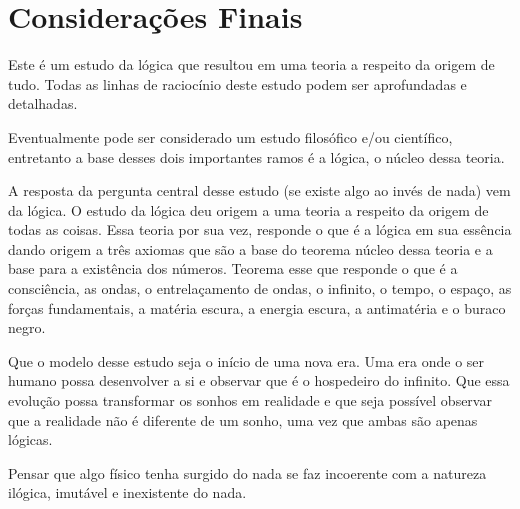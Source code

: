 \section*{Considerações Finais}
Este é um estudo da lógica que resultou em uma teoria a respeito da origem de tudo. Todas as linhas de raciocínio deste estudo podem ser aprofundadas e detalhadas. 

Eventualmente pode ser considerado um estudo filosófico e/ou científico, entretanto a base desses dois importantes ramos é a lógica, o núcleo dessa teoria. 

A resposta da pergunta central desse estudo (se existe algo ao invés de nada) vem da lógica. O estudo da lógica deu origem a uma teoria a respeito da origem de todas as coisas. Essa teoria por sua vez, responde o que é a lógica em sua essência dando origem a três axiomas que são a base do teorema núcleo dessa teoria e a base para a existência dos números. Teorema esse que responde o que é a consciência, as ondas, o entrelaçamento de ondas, o infinito, o tempo, o espaço, as forças fundamentais, a matéria escura, a energia escura, a antimatéria e o buraco negro.

Que o modelo desse estudo seja o início de uma nova era. Uma era onde o ser humano possa desenvolver a si e observar que é o hospedeiro do infinito. Que essa evolução possa transformar os sonhos em realidade e que seja possível observar que a realidade não é diferente de um sonho, uma vez que ambas são apenas lógicas.

Pensar que algo físico tenha surgido do nada se faz incoerente com a natureza ilógica, imutável e inexistente do nada.